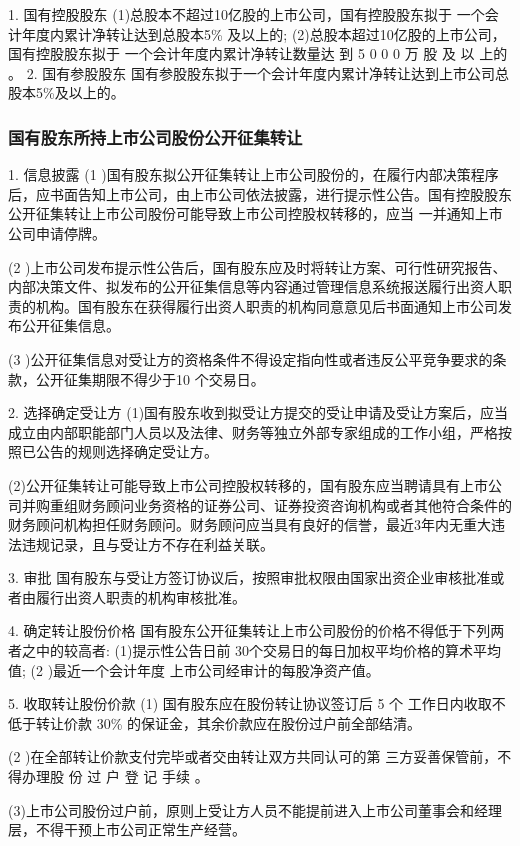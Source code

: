 \documentclass[UTF8,12pt]{ctexart}
\numberwithin{equation}{section} %
\numberwithin{figure}{section}
\numberwithin{table}{section}
\begin{document}
	1. 国有控股股东
	(1)总股本不超过10亿股的上市公司，国有控股股东拟于 一个会计年度内累计净转让达到总股本5\% 及以上的;
	(2)总股本超过10亿股的上市公司，国有控股股东拟于 一个会计年度内累计净转让数量达 到 5 0 0 0 万 股 及 以 上的 。
	2. 国有参股股东
	国有参股股东拟于一个会计年度内累计净转让达到上市公司总股本5\%及以上的。
	
	\subsubsection{国有股东所持上市公司股份公开征集转让}
	1. 信息披露
	(1 )国有股东拟公开征集转让上市公司股份的，在履行内部决策程序后，应书面告知上市公司，由上市公司依法披露，进行提示性公告。国有控股股东公开征集转让上市公司股份可能导致上市公司控股权转移的，应当 一并通知上市公司申请停牌。
	
	(2 )上市公司发布提示性公告后，国有股东应及时将转让方案、可行性研究报告、内部决策文件、拟发布的公开征集信息等内容通过管理信息系统报送履行出资人职责的机构。国有股东在获得履行出资人职责的机构同意意见后书面通知上市公司发布公开征集信息。
	
	(3 )公开征集信息对受让方的资格条件不得设定指向性或者违反公平竞争要求的条款，公开征集期限不得少于10 个交易日。
	
	2. 选择确定受让方
	(1)国有股东收到拟受让方提交的受让申请及受让方案后，应当成立由内部职能部门人员以及法律、财务等独立外部专家组成的工作小组，严格按照已公告的规则选择确定受让方。
	
	(2)公开征集转让可能导致上市公司控股权转移的，国有股东应当聘请具有上市公司并购重组财务顾问业务资格的证券公司、证券投资咨询机构或者其他符合条件的财务顾问机构担任财务顾问。财务顾问应当具有良好的信誉，最近3年内无重大违法违规记录，且与受让方不存在利益关联。
	
	3. 审批
	国有股东与受让方签订协议后，按照审批权限由国家出资企业审核批准或者由履行出资人职责的机构审核批准。
	
	4. 确定转让股份价格
	国有股东公开征集转让上市公司股份的价格不得低于下列两者之中的较高者:
	(1)提示性公告日前 30个交易日的每日加权平均价格的算术平均值;
	(2 )最近一个会计年度 上市公司经审计的每股净资产值。
	
	5. 收取转让股份价款
	(1) 国有股东应在股份转让协议签订后 5 个 工作日内收取不低于转让价款 30\% 的保证金，其余价款应在股份过户前全部结清。
	
	(2 )在全部转让价款支付完毕或者交由转让双方共同认可的第 三方妥善保管前，不得办理股 份 过 户 登 记 手续 。
	
	(3)上市公司股份过户前，原则上受让方人员不能提前进入上市公司董事会和经理层，不得干预上市公司正常生产经营。
	
\end{document}
